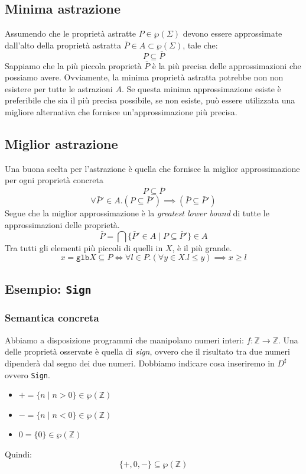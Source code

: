 \subsection{Minima astrazione}
Assumendo che le proprietà astratte $P \in \wp(\Sigma)$ devono essere approssimate 
dall'alto della proprietà astratta $\bar{P} \in A \subset \wp(\Sigma)$, tale che:
\[
  P \subseteq \bar{P}
\]
Sappiamo che la più piccola proprietà $\bar{P}$ è la più precisa delle approssimazioni che possiamo avere.
Ovviamente, la minima proprietà astratta potrebbe non non esistere per tutte le astrazioni $A$.
Se questa minima approssimazione esiste è preferibile che sia il più precisa possibile, se non esiste,
può essere utilizzata una
migliore alternativa che fornisce un'approssimazione più precisa.
\subsection{Miglior astrazione}
Una buona scelta per l'astrazione è quella che fornisce la
miglior approssimazione per ogni proprietà concreta
\[
  P \subseteq \bar{P}
\]
\[
  \forall \bar{P}' \in A . (P \subseteq \bar{P}') \implies (\bar{P} \subseteq \bar{P}')
\]
Segue che la miglior approssimazione è la \textit{greatest lower bound} di tutte le approssimazioni
delle proprietà.
\[
\bar{P} = \bigcap \{\bar{P}' \in A \mid P \subseteq \bar{P}'\} \in A
\]
Tra tutti gli elementi più piccoli di quelli in $X$, è il più grande.
\[
  x = \texttt{glb}X \subseteq P \iff \forall l \in P . (\forall y \in X. l \leq y) \implies x \geq l
\]
\subsection{Esempio: \texttt{Sign}}
\subsubsection{Semantica concreta}
Abbiamo a disposizione programmi che manipolano numeri interi: \(f: \mathbb{Z} \to \mathbb{Z}\). Una delle 
proprietà osservate è quella di \textit{sign}, ovvero che il risultato tra due numeri dipenderà dal segno
dei due numeri. Dobbiamo indicare cosa inseriremo in $D^\sharp$ ovvero \texttt{Sign}.
\begin{itemize}
  \item $+ = \{n \mid n > 0\} \in \wp(\mathbb{Z})$
  \item $- = \{n \mid n < 0\} \in \wp(\mathbb{Z})$
  \item $0 = \{0\} \in \wp(\mathbb{Z})$
\end{itemize}
Quindi:
\[
  \{+, 0, -\} \subseteq \wp(\mathbb{Z})
\] 

